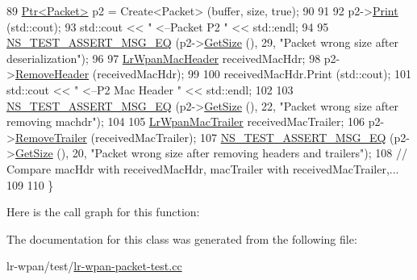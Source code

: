 \begin{DoxyCode}
89   \hyperlink{classns3_1_1Ptr}{Ptr<Packet>} p2 = Create<Packet> (buffer, size, \textcolor{keyword}{true});
90 
91 
92   p2->\hyperlink{classns3_1_1Packet_aa34058a5cdbf94673531f8c4001ab227}{Print} (std::cout);
93   std::cout << \textcolor{stringliteral}{" <--Packet P2 "} << std::endl;
94 
95   \hyperlink{group__testing_ga2a9d78cffb3db8e867c35fff0b698cf5}{NS\_TEST\_ASSERT\_MSG\_EQ} (p2->\hyperlink{classns3_1_1Packet_a462855c9929954d4301a4edfe55f4f1c}{GetSize} (), 29, \textcolor{stringliteral}{"Packet wrong size after
       deserialization"});
96 
97   \hyperlink{classns3_1_1LrWpanMacHeader}{LrWpanMacHeader} receivedMacHdr;
98   p2->\hyperlink{classns3_1_1Packet_a0961eccf975d75f902d40956c93ba63e}{RemoveHeader} (receivedMacHdr);
99 
100   receivedMacHdr.Print (std::cout);
101   std::cout << \textcolor{stringliteral}{" <--P2 Mac Header "} << std::endl;
102 
103   \hyperlink{group__testing_ga2a9d78cffb3db8e867c35fff0b698cf5}{NS\_TEST\_ASSERT\_MSG\_EQ} (p2->\hyperlink{classns3_1_1Packet_a462855c9929954d4301a4edfe55f4f1c}{GetSize} (), 22, \textcolor{stringliteral}{"Packet wrong size after removing
       machdr"});
104 
105   \hyperlink{classns3_1_1LrWpanMacTrailer}{LrWpanMacTrailer} receivedMacTrailer;
106   p2->\hyperlink{classns3_1_1Packet_a2155e042083e9a17ad3b33f9fecb4be4}{RemoveTrailer} (receivedMacTrailer);
107   \hyperlink{group__testing_ga2a9d78cffb3db8e867c35fff0b698cf5}{NS\_TEST\_ASSERT\_MSG\_EQ} (p2->\hyperlink{classns3_1_1Packet_a462855c9929954d4301a4edfe55f4f1c}{GetSize} (), 20, \textcolor{stringliteral}{"Packet wrong size after removing
       headers and trailers"});
108   \textcolor{comment}{// Compare macHdr with receivedMacHdr, macTrailer with receivedMacTrailer,...}
109 
110 \}
\end{DoxyCode}


Here is the call graph for this function\+:




The documentation for this class was generated from the following file\+:\begin{DoxyCompactItemize}
\item 
lr-\/wpan/test/\hyperlink{lr-wpan-packet-test_8cc}{lr-\/wpan-\/packet-\/test.\+cc}\end{DoxyCompactItemize}
